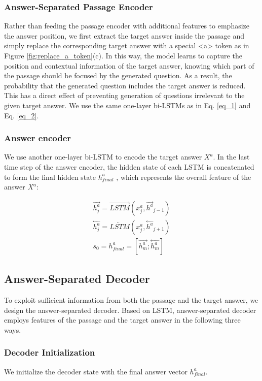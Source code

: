 \documentclass[letterpaper]{article} %
\begin{document}
\subsubsection{Answer-Separated Passage Encoder}
Rather than feeding the passage encoder with additional features to emphasize the answer position, we first extract the target answer inside the passage and simply replace the corresponding target answer with a special \textless a\textgreater{} token as in Figure \ref{fig:replace_a_token}(c). In this way, the model learns to capture the position and contextual information of the target answer, knowing which part of the passage should be focused by the generated question. As a result, the probability that the generated question includes the target answer is reduced. This has a direct effect of preventing generation of questions irrelevant to the given target answer. We use the same one-layer bi-LSTMs as in Eq. \eqref{eq_1} and Eq. \eqref{eq_2}.

\subsubsection{Answer encoder}
We use another one-layer bi-LSTM to encode the target answer \(X^a\). In the last time step of the answer encoder, the hidden state of each LSTM is concatenated to form the final hidden state \(h^a_{final}\) , which represents the overall feature of the answer \(X^a\):

\begin{gather}
\overset{\rightarrow}{h^a_j} = \overrightarrow{LSTM}(x^a_j, \overset{\rightarrow}{h^a}_{j-1})  \label{eq_11} \\
\overset{\leftarrow}{h^a_j} = \overleftarrow{LSTM}(x^a_j, \overset{\leftarrow}{h^a}_{j+1})  \label{eq_12} \\
s_0 = h^a_{final} = [\overset{\rightarrow}{h^a_m};\overset{\leftarrow}{h^a_m}] \label{eq_13}
\end{gather}



\subsection{Answer-Separated Decoder}
To exploit sufficient information from both the passage and the target answer, we design the answer-separated decoder. Based on LSTM, answer-separated decoder employs features of the passage and the target answer in the following three ways.

\subsubsection{Decoder Initialization} 
We initialize the decoder state with the final answer vector \(h^a_{final}\).
\end{document}
